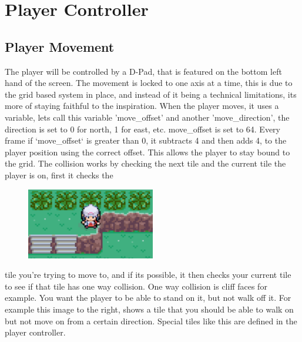 \documentclass[11pt,a4paper]{article}
\begin{document}
\section{Player Controller}
\subsection{Player Movement}
The player will be controlled by a D-Pad, that is featured on the bottom left hand of the screen. The movement is locked to one axis at a time, this is due to the grid based system in place, and instead of it being a technical limitations, its more of staying faithful to the inspiration. When the player moves, it uses a variable, lets call this variable 'move\_offset' and another 'move\_direction', the direction is set to 0 for north, 1 for east, etc. move\_offset is set to 64. Every frame if `move\_offset` is greater than 0, it subtracts 4 and then adds 4, to the player position using the correct offset. This allows the player to stay bound to the grid. The collision works by checking the next tile and the current tile the player is on, first it checks the\begin{figure}
\begin{center}\includegraphics[width=0.5\textwidth,trim ]{Capture.PNG}\end{center}\end{figure} tile you're trying to move to, and if its possible, it then checks your current tile to see if that tile has one way collision. One way collision is cliff faces for example. You want the player to be able to stand on it, but not walk off it. For example this image to the right, shows a tile that you should be able to walk on but not move on from a certain direction. Special tiles like this are defined in the player controller.
\end{document}
